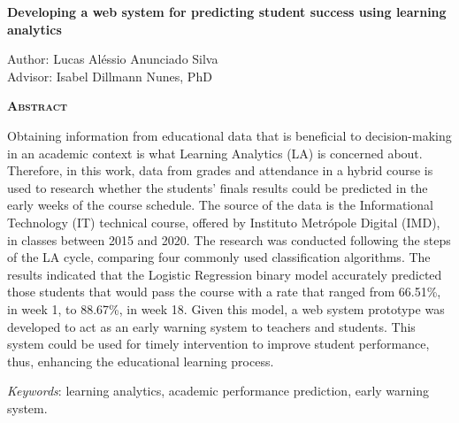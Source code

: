 \begin{center}
	{\Large{\textbf{Developing a web system for predicting student success using learning analytics}}}
\end{center}

\vspace{1cm}

\begin{flushright}
	Author: Lucas Aléssio Anunciado Silva\\
	Advisor: Isabel Dillmann Nunes, PhD
\end{flushright}

\vspace{1cm}

\begin{center}
	\Large{\textsc{\textbf{Abstract}}}
\end{center}

\noindent Obtaining information from educational data that is beneficial to decision-making in an academic context is what Learning Analytics (LA) is concerned about. Therefore, in this work, data from grades and attendance in a hybrid course is used to research whether the students' finals results could be predicted in the early weeks of the course schedule. The source of the data is the Informational Technology (IT) technical course, offered by Instituto Metrópole Digital (IMD), in classes between 2015 and 2020. The research was conducted following the steps of the LA cycle, comparing four commonly used classification algorithms. The results indicated that the Logistic Regression binary model accurately predicted those students that would pass the course with a rate that ranged from 66.51\%, in week 1, to 88.67\%, in week 18. Given this model, a web system prototype was developed to act as an early warning system to teachers and students. This system could be used for timely intervention to improve student performance, thus, enhancing the educational learning process.

\noindent\textit{Keywords}: learning analytics, academic performance prediction, early warning system.
